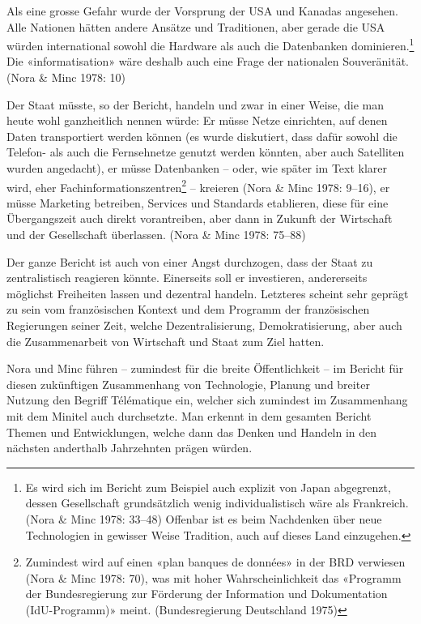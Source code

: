 \documentclass[a4paper,
fontsize=11pt,
oneside,
numbers=noperiodatend,
parskip=half-,
bibliography=totoc,
final
]{scrartcl}
\begin{document}
Als eine grosse Gefahr wurde der Vorsprung der USA und Kanadas
angesehen. Alle Nationen hätten andere Ansätze und Traditionen, aber
gerade die USA würden international sowohl die Hardware als auch die
Datenbanken dominieren.\footnote{Es wird sich im Bericht zum Beispiel
  auch explizit von Japan abgegrenzt, dessen Gesellschaft grundsätzlich
  wenig individualistisch wäre als Frankreich. (Nora \& Minc 1978:
  33--48) Offenbar ist es beim Nachdenken über neue Technologien in
  gewisser Weise Tradition, auch auf dieses Land einzugehen.} Die
«informatisation» wäre deshalb auch eine Frage der nationalen
Souveränität. (Nora \& Minc 1978: 10)

Der Staat müsste, so der Bericht, handeln und zwar in einer Weise, die
man heute wohl ganzheitlich nennen würde: Er müsse Netze einrichten, auf
denen Daten transportiert werden können (es wurde diskutiert, dass dafür
sowohl die Telefon- als auch die Fernsehnetze genutzt werden könnten,
aber auch Satelliten wurden angedacht), er müsse Datenbanken -- oder,
wie später im Text klarer wird, eher Fachinformationszentren\footnote{Zumindest
  wird auf einen «plan banques de données» in der BRD verwiesen (Nora \&
  Minc 1978: 70), was mit hoher Wahrscheinlichkeit das «Programm der
  Bundesregierung zur Förderung der Information und Dokumentation
  (IdU-Programm)» meint. (Bundesregierung Deutschland 1975)} -- kreieren
(Nora \& Minc 1978: 9--16), er müsse Marketing betreiben, Services und
Standards etablieren, diese für eine Übergangszeit auch direkt
vorantreiben, aber dann in Zukunft der Wirtschaft und der Gesellschaft
überlassen. (Nora \& Minc 1978: 75--88)

Der ganze Bericht ist auch von einer Angst durchzogen, dass der Staat zu
zentralistisch reagieren könnte. Einerseits soll er investieren,
andererseits möglichst Freiheiten lassen und dezentral handeln.
Letzteres scheint sehr geprägt zu sein vom französischen Kontext und dem
Programm der französischen Regierungen seiner Zeit, welche
Dezentralisierung, Demokratisierung, aber auch die Zusammenarbeit von
Wirtschaft und Staat zum Ziel hatten.

Nora und Minc führen -- zumindest für die breite Öffentlichkeit -- im
Bericht für diesen zukünftigen Zusammenhang von Technologie, Planung und
breiter Nutzung den Begriff Télématique ein, welcher sich zumindest im
Zusammenhang mit dem Minitel auch durchsetzte. Man erkennt in dem
gesamten Bericht Themen und Entwicklungen, welche dann das Denken und
Handeln in den nächsten anderthalb Jahrzehnten prägen würden.
\end{document}
